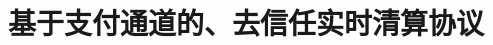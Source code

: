 \documentclass[lang=cn,headings=optiontohead]{elegantpaper}
\title{基于支付通道的、去信任实时清算协议}
\institute{OK区块链工程院}
\begin{document}
\maketitle



\newpage

\tableofcontents

\lstlistoflistings

\newpage












\pagebreak


\pagebreak
\end{document}

